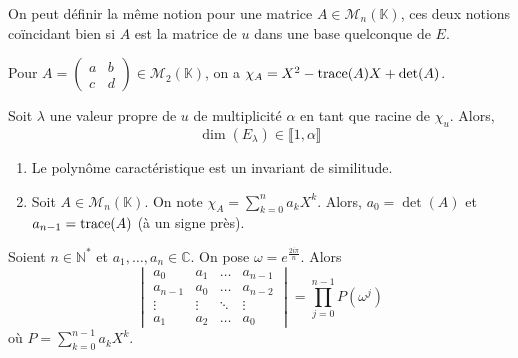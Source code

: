   \begin{remark}
    On peut définir la même notion pour une matrice $A \in \mathcal{M}_n(\mathbb{K})$, ces deux notions coïncidant bien si $A$ est la matrice de $u$ dans une base quelconque de $E$.
  \end{remark}

  \begin{example}
    Pour $A = \begin{pmatrix} a & b \\ c & d \end{pmatrix} \in \mathcal{M}_2(\mathbb{K})$, on a $\chi_A = X^2 - \operatorname{trace}(A)X + \det(A)$.
  \end{example}

  \begin{proposition}
    Soit $\lambda$ une valeur propre de $u$ de multiplicité $\alpha$ en tant que racine de $\chi_u$. Alors,
    \[ \dim(E_\lambda) \in \llbracket 1, \alpha \rrbracket \]
  \end{proposition}


  \begin{proposition}
    \begin{enumerate}[label=(\roman*)]
      \item Le polynôme caractéristique est un invariant de similitude.
      \item Soit $A \in \mathcal{M}_n(\mathbb{K})$. On note $\chi_A = \sum_{k=0}^n a_k X^k$. Alors, $a_0 = \det(A)$ et $a_{n-1} = \operatorname{trace}(A)$ (à un signe près).
    \end{enumerate}
  \end{proposition}
  
  
  \begin{lemma}
    \label{suite-de-polygones-1}
    Soient $n \in \mathbb{N}^*$ et $a_1, \dots, a_n \in \mathbb{C}$. On pose $\omega = e^{\frac{2i\pi}{n}}$. Alors
    \[ \begin{vmatrix} a_0 & a_1 & \dots & a_{n-1} \\ a_{n-1} & a_0 & \dots & a_{n-2}\\ \vdots & \vdots & \ddots & \vdots \\ a_1 & a_2 & \dots & a_0 \end{vmatrix} = \prod_{j=0}^{n-1} P(\omega^j) \]
    où $P = \sum_{k=0}^{n-1} a_k X^k$.
  \end{lemma}
  
  
